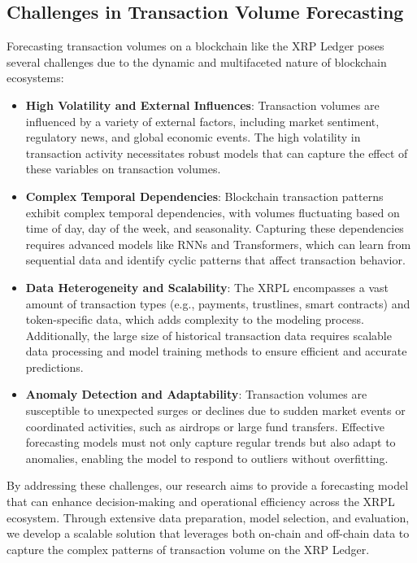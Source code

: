 \documentclass{article}
\begin{document}
\subsection{Challenges in Transaction Volume Forecasting}
Forecasting transaction volumes on a blockchain like the XRP Ledger poses several challenges due to the dynamic and multifaceted nature of blockchain ecosystems:
\begin{itemize}
    \item \textbf{High Volatility and External Influences}: Transaction volumes are influenced by a variety of external factors, including market sentiment, regulatory news, and global economic events. The high volatility in transaction activity necessitates robust models that can capture the effect of these variables on transaction volumes.
    
    \item \textbf{Complex Temporal Dependencies}: Blockchain transaction patterns exhibit complex temporal dependencies, with volumes fluctuating based on time of day, day of the week, and seasonality. Capturing these dependencies requires advanced models like RNNs and Transformers, which can learn from sequential data and identify cyclic patterns that affect transaction behavior.
    
    \item \textbf{Data Heterogeneity and Scalability}: The XRPL encompasses a vast amount of transaction types (e.g., payments, trustlines, smart contracts) and token-specific data, which adds complexity to the modeling process. Additionally, the large size of historical transaction data requires scalable data processing and model training methods to ensure efficient and accurate predictions.
    
    \item \textbf{Anomaly Detection and Adaptability}: Transaction volumes are susceptible to unexpected surges or declines due to sudden market events or coordinated activities, such as airdrops or large fund transfers. Effective forecasting models must not only capture regular trends but also adapt to anomalies, enabling the model to respond to outliers without overfitting.
\end{itemize}

By addressing these challenges, our research aims to provide a forecasting model that can enhance decision-making and operational efficiency across the XRPL ecosystem. Through extensive data preparation, model selection, and evaluation, we develop a scalable solution that leverages both on-chain and off-chain data to capture the complex patterns of transaction volume on the XRP Ledger.
\end{document}
